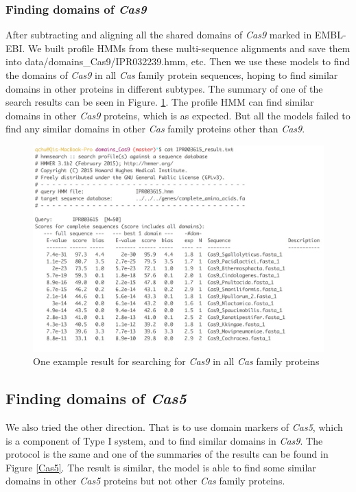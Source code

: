 \documentclass[11pt, oneside]{article}
\begin{document}
\subsubsection{Finding domains of \textit{Cas9}}

After subtracting and aligning all the shared domains of \textit{Cas9} marked in EMBL-EBI. We built profile HMMs from these multi-sequence alignments and save them into data/domains\_Cas9/IPR032239.hmm, etc. Then we use these models to find the domains of \textit{Cas9} in all \textit{Cas} family protein sequences, hoping to find similar domains in other proteins in different subtypes. The summary of one of the search results can be seen in Figure. \ref{Cas9}. The profile HMM can find similar domains in other \textit{Cas9} proteins, which is as expected. But all the models failed to find any similar domains in other \textit{Cas} family proteins other than \textit{Cas9}.

\begin{figure}[ht]
  \centering
  \includegraphics[scale = 0.3]{images/cas9Domain}
      \caption{One example result for searching for \textit{Cas9} in all \textit{Cas} family proteins}
      \label{Cas9}
\end{figure} 

\subsection{Finding domains of \textit{Cas5}}

We also tried the other direction. That is to use domain markers of \textit{Cas5}, which is a component of Type I system, and to find similar domains in \textit{Cas9}. The protocol is the same and one of the summaries of the results can be found in Figure \ref{Cas5}. The result is similar, the model is able to find some similar domains in other \textit{Cas5} proteins but not other \textit{Cas} family proteins.
\end{document}
